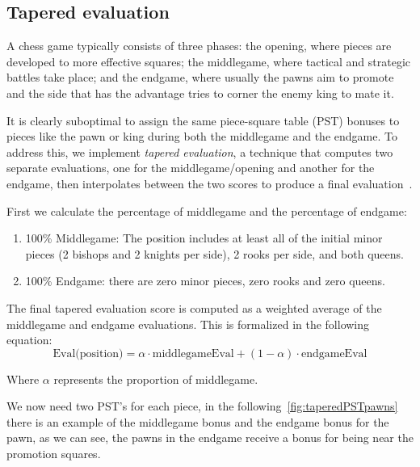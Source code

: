 \subsection*{Tapered evaluation}

A chess game typically consists of three phases: the opening, where pieces are developed to more effective squares; the middlegame, where tactical and strategic battles take place; and the endgame, where usually the pawns aim to promote and the side that has the advantage tries to corner the enemy king to mate it.

\vspace{1em}

\noindent It is clearly suboptimal to assign the same piece-square table (PST) bonuses to pieces like the pawn or king during both the middlegame and the endgame. To address this, we implement \textit{tapered evaluation}, a technique that computes two separate evaluations, one for the middlegame/opening and another for the endgame, then interpolates between the two scores to produce a final evaluation~\cite{TaperedEvaluation}.

\vspace{1em}

\noindent First we calculate the percentage of middlegame and the percentage of endgame:

\begin{enumerate}
    \item 100\% Middlegame: The position includes at least all of the initial minor pieces (2 bishops and 2 knights per side), 2 rooks per side, and both queens.
    \item 100\% Endgame: there are zero minor pieces, zero rooks and zero queens.
\end{enumerate}

\noindent The final tapered evaluation score is computed as a weighted average of the middlegame and endgame evaluations. This is formalized in the following equation:
\begin{equation*}
    \text{Eval(position)} = \alpha \cdot \text{middlegameEval} + (1 - \alpha) \cdot \text{endgameEval}
\end{equation*}

\noindent Where $\alpha$ represents the proportion of middlegame.

\vspace{1em}

\noindent We now need two PST's for each piece, in the following~\cref{fig:taperedPSTpawns} there is an example of the middlegame bonus and the endgame bonus for the pawn, as we can see, the pawns in the endgame receive a bonus for being near the promotion squares.

